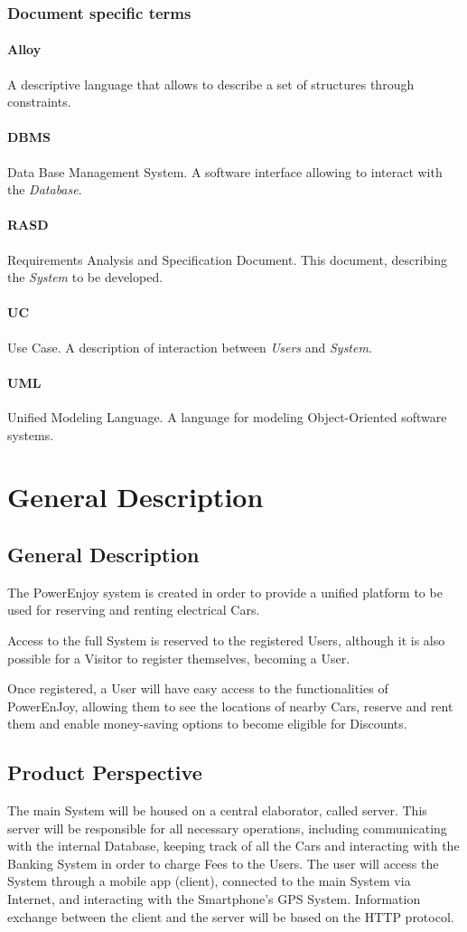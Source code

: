 \documentclass[12pt]{article}
\begin{document}
\subsubsection{Document specific terms}
\paragraph{Alloy}
A descriptive language that allows to describe a set of structures through constraints.
\paragraph{DBMS}
Data Base Management System. A software interface allowing to interact with the \emph{Database}.
\paragraph{RASD}
Requirements Analysis and Specification Document. This document, describing the \emph{System} to be developed.
\paragraph{UC}
Use Case. A description of interaction between \emph{Users} and \emph{System}.
\paragraph{UML}
Unified Modeling Language. A language for modeling Object-Oriented software systems.

\clearpage\section{General Description}
\subsection{General Description}
The PowerEnjoy system is created in order to provide a unified platform to be used for reserving and renting electrical Cars.

Access to the full System is reserved to the registered Users, although it is also possible for a Visitor to register themselves, becoming a User.

Once registered, a User will have easy access to the functionalities of PowerEnJoy, allowing them to see the locations of nearby Cars, reserve and rent them and enable money-saving options to become eligible for Discounts.
\subsection{Product Perspective}
The main System will be housed on a central elaborator, called server. This server will be responsible for all necessary operations, including communicating with the internal Database, keeping track of all the Cars and interacting with the Banking System in order to charge Fees to the Users.
The user will access the System through a mobile app (client), connected to the main System via Internet, and interacting with the Smartphone's GPS System. Information exchange between the client and the server will be based on the HTTP protocol.
\end{document}
